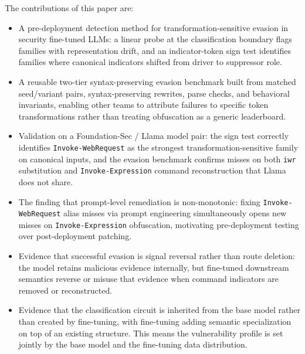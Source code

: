 \documentclass{article}
\begin{document}
The contributions of this paper are:
\begin{itemize}[leftmargin=1.5em,itemsep=0.15em,topsep=0.15em,parsep=0pt,partopsep=0pt]
  \item A pre-deployment detection method for transformation-sensitive evasion in security fine-tuned LLMs: a linear probe at the classification boundary flags families with representation drift, and an indicator-token sign test identifies families where canonical indicators shifted from driver to suppressor role.
  \item A reusable two-tier syntax-preserving evasion benchmark built from matched seed/variant pairs, syntax-preserving rewrites, parse checks, and behavioral invariants, enabling other teams to attribute failures to specific token transformations rather than treating obfuscation as a generic leaderboard.
  \item Validation on a Foundation-Sec / Llama model pair: the sign test correctly identifies \texttt{Invoke-WebRequest} as the strongest transformation-sensitive family on canonical inputs, and the evasion benchmark confirms misses on both \texttt{iwr} substitution and \texttt{Invoke-Expression} command reconstruction that Llama does not share.
  \item The finding that prompt-level remediation is non-monotonic: fixing \texttt{Invoke-WebRequest} alias misses via prompt engineering simultaneously opens new misses on \texttt{Invoke-Expression} obfuscation, motivating pre-deployment testing over post-deployment patching.
  \item Evidence that successful evasion is signal reversal rather than route deletion: the model retains malicious evidence internally, but fine-tuned downstream semantics reverse or misuse that evidence when command indicators are removed or reconstructed.
  \item Evidence that the classification circuit is inherited from the base model rather than created by fine-tuning, with fine-tuning adding semantic specialization on top of an existing structure. This means the vulnerability profile is set jointly by the base model and the fine-tuning data distribution.
\end{itemize}
\end{document}
